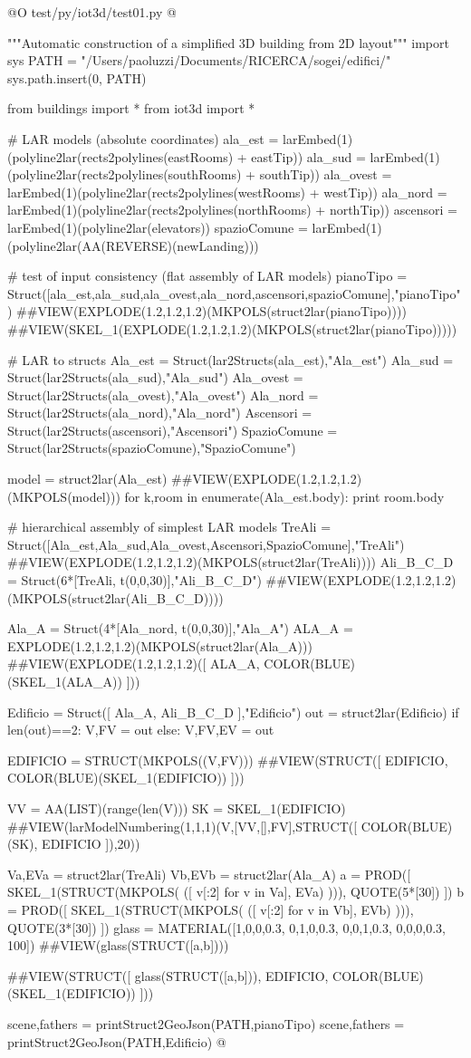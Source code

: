 \documentclass[11pt,oneside]{article}	%
\begin{document}
@O test/py/iot3d/test01.py
@{"""Automatic construction of a simplified 3D building from 2D layout"""
import sys
PATH = "/Users/paoluzzi/Documents/RICERCA/sogei/edifici/"
sys.path.insert(0, PATH)

from buildings import *
from iot3d import *

# LAR models (absolute coordinates)
ala_est = larEmbed(1)(polyline2lar(rects2polylines(eastRooms) + eastTip))
ala_sud = larEmbed(1)(polyline2lar(rects2polylines(southRooms) + southTip))
ala_ovest = larEmbed(1)(polyline2lar(rects2polylines(westRooms) + westTip))
ala_nord = larEmbed(1)(polyline2lar(rects2polylines(northRooms) + northTip)) 
ascensori = larEmbed(1)(polyline2lar(elevators))
spazioComune = larEmbed(1)(polyline2lar(AA(REVERSE)(newLanding)))

# test of input consistency (flat assembly of LAR models)
pianoTipo = Struct([ala_est,ala_sud,ala_ovest,ala_nord,ascensori,spazioComune],"pianoTipo")
##VIEW(EXPLODE(1.2,1.2,1.2)(MKPOLS(struct2lar(pianoTipo))))
##VIEW(SKEL_1(EXPLODE(1.2,1.2,1.2)(MKPOLS(struct2lar(pianoTipo)))))

# LAR to structs
Ala_est = Struct(lar2Structs(ala_est),"Ala_est")
Ala_sud = Struct(lar2Structs(ala_sud),"Ala_sud")
Ala_ovest = Struct(lar2Structs(ala_ovest),"Ala_ovest")
Ala_nord = Struct(lar2Structs(ala_nord),"Ala_nord")
Ascensori = Struct(lar2Structs(ascensori),"Ascensori")
SpazioComune = Struct(lar2Structs(spazioComune),"SpazioComune")

model = struct2lar(Ala_est)
##VIEW(EXPLODE(1.2,1.2,1.2)(MKPOLS(model)))
for k,room in enumerate(Ala_est.body):
    print room.body

# hierarchical assembly of simplest LAR models
TreAli = Struct([Ala_est,Ala_sud,Ala_ovest,Ascensori,SpazioComune],"TreAli")
##VIEW(EXPLODE(1.2,1.2,1.2)(MKPOLS(struct2lar(TreAli))))
Ali_B_C_D = Struct(6*[TreAli, t(0,0,30)],"Ali_B_C_D")
##VIEW(EXPLODE(1.2,1.2,1.2)(MKPOLS(struct2lar(Ali_B_C_D))))

Ala_A = Struct(4*[Ala_nord,  t(0,0,30)],"Ala_A")
ALA_A = EXPLODE(1.2,1.2,1.2)(MKPOLS(struct2lar(Ala_A)))
##VIEW(EXPLODE(1.2,1.2,1.2)([ ALA_A, COLOR(BLUE)(SKEL_1(ALA_A)) ]))

Edificio = Struct([ Ala_A, Ali_B_C_D ],"Edificio")
out = struct2lar(Edificio)
if len(out)==2: V,FV = out
else: V,FV,EV = out

EDIFICIO = STRUCT(MKPOLS((V,FV)))
##VIEW(STRUCT([ EDIFICIO, COLOR(BLUE)(SKEL_1(EDIFICIO)) ]))

VV = AA(LIST)(range(len(V)))
SK = SKEL_1(EDIFICIO)
##VIEW(larModelNumbering(1,1,1)(V,[VV,[],FV],STRUCT([ COLOR(BLUE)(SK), EDIFICIO ]),20))

Va,EVa = struct2lar(TreAli)
Vb,EVb = struct2lar(Ala_A)
a = PROD([ SKEL_1(STRUCT(MKPOLS( ([ v[:2] for v in Va], EVa) ))), QUOTE(5*[30]) ])
b = PROD([ SKEL_1(STRUCT(MKPOLS( ([ v[:2] for v in Vb], EVb) ))), QUOTE(3*[30]) ])
glass = MATERIAL([1,0,0,0.3,  0,1,0,0.3,  0,0,1,0.3, 0,0,0,0.3, 100])
##VIEW(glass(STRUCT([a,b])))

##VIEW(STRUCT([ glass(STRUCT([a,b])), EDIFICIO, COLOR(BLUE)(SKEL_1(EDIFICIO)) ]))


scene,fathers = printStruct2GeoJson(PATH,pianoTipo)
scene,fathers = printStruct2GeoJson(PATH,Edificio)
@}
\end{document}
